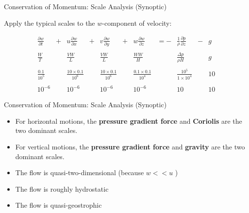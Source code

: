 \begin{frame}{Conservation of Momentum: Scale Analysis (Synoptic)}

Apply the typical scales to the $w$-component of velocity:

\begin{align*}
&\frac{\partial w}{\partial t}& + &u \frac{\partial w}{\partial x}& + &v \frac{\partial w}{\partial y}& + &w \frac{\partial w}{\partial z}& = -& \frac{1}{\rho} \frac{\partial p}{\partial z}& - &g& \\\\
&\frac{W}{T}&  &\frac{VW}{L}& &\frac{VW}{L}& &\frac{WW}{H}& &\frac{\Delta p}{\rho H}& &g&\\\\
&\frac{0.1}{10^5}& &\frac{10\times0.1}{10^6}& &\frac{10\times0.1}{10^6}& &\frac{0.1 \times 0.1}{10^4}& &\frac{10^5}{1 \times 10^4}& &10&\\\\
&10^{-6}& &10^{-6}& &10^{-6}& &10^{-6}& &10& &10&
\end{align*}
\end{frame}

\begin{frame}{Conservation of Momentum: Scale Analysis (Synoptic)}

\begin{itemize}
	\item For horizontal motions, the \textbf{pressure gradient force} and \textbf{Coriolis} are the two dominant scales.
	\item For vertical motions, the \textbf{pressure gradient force} and \textbf{gravity} are the two dominant scales.
	\item The flow is quasi-two-dimensional (because $w << u$ )
	\item The flow is roughly hydrostatic
	\item The flow is quasi-geostrophic
\end{itemize}

\end{frame}

